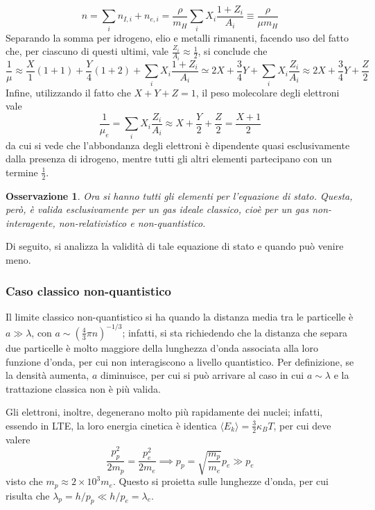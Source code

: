 \documentclass[11pt, a4paper]{scrartcl}
\theoremstyle{style}
\newtheorem{osservazione}{Osservazione}[section]
\theoremstyle{style1}
\numberwithin{equation}{subsection}
\begin{document}
\[
n = \sum_{i}^{} n_{I,i}  + n_{e, i}  = \frac{\rho }{m_H} \sum_{i}^{} X_i \frac{1+ Z_i}{A_i} \equiv \frac{\rho }{\mu m_H}
\] 
Separando la somma per idrogeno, elio e metalli rimanenti, facendo uso del fatto che, per ciascuno di questi ultimi, vale $\frac{Z_i}{A_i}\approx\frac{1}{2}$, si conclude che
\[
\frac{1}{\mu } \approx \frac{X}{1}(1+1) + \frac{Y}{4}(1+2) + \sum_{i}^{} X_i \frac{1+Z_i}{A_i} \simeq 2X + \frac{3}{4}Y + \sum_{i}^{} X_i \frac{Z_i}{A_i} \approx 2X + \frac{3}{4}Y + \frac{Z}{2}
\] 
Infine, utilizzando il fatto che $X+Y+Z = 1$, il peso molecolare degli elettroni vale
\[
\frac{1}{\mu _e} = \sum_{i}^{} X_i \frac{Z_i}{A_i} \approx X + \frac{Y}{2} + \frac{Z}{2} = \frac{X+1}{2}
\] 
da cui si vede che l'abbondanza degli elettroni \`e dipendente quasi esclusivamente dalla presenza di idrogeno, mentre tutti gli altri elementi partecipano con un termine $\frac{1}{2}$.
\begin{osservazione}
Ora si hanno tutti gli elementi per l'equazione di stato.
Questa, per\`o, \`e valida esclusivamente per un gas ideale classico, cio\`e per un gas non-interagente, non-relativistico e non-quantistico.
\end{osservazione}
\noindent Di seguito, si analizza la validit\`a di tale equazione di stato e quando pu\`o venire meno.

\subsubsection{Caso classico non-quantistico}

Il limite classico non-quantistico si ha quando la distanza media tra le particelle \`e $a \gg \lambda$, con $a\sim \left(\frac{4}{3}\pi n\right) ^{-1 / 3}$; infatti, si sta richiedendo che la distanza che separa due particelle \`e molto maggiore della lunghezza d'onda associata alla loro funzione d'onda, per cui non interagiscono a livello quantistico.
Per definizione, se la densit\`a aumenta, $a$ diminuisce, per cui si pu\`o arrivare al caso in cui $a \sim \lambda$ e la trattazione classica non \`e pi\`u valida.

Gli elettroni, inoltre, degenerano molto pi\`u rapidamente dei nuclei; infatti, essendo in LTE, la loro energia cinetica \`e identica $\langle E_k \rangle = \frac{3}{2} \kappa _B T$, per cui deve valere
\[
\frac{p_p^2}{2m_p} = \frac{p_e^2}{2m_e} \implies p_p = \sqrt{\frac{m_p}{m_e}} p_e \gg p_e
\] 
visto che $m_p \approx 2\times 10^3 m_e$.
Questo si proietta sulle lunghezze d'onda, per cui risulta che $\lambda _p = h / p_p \ll h / p_e = \lambda _e$.
\end{document}
